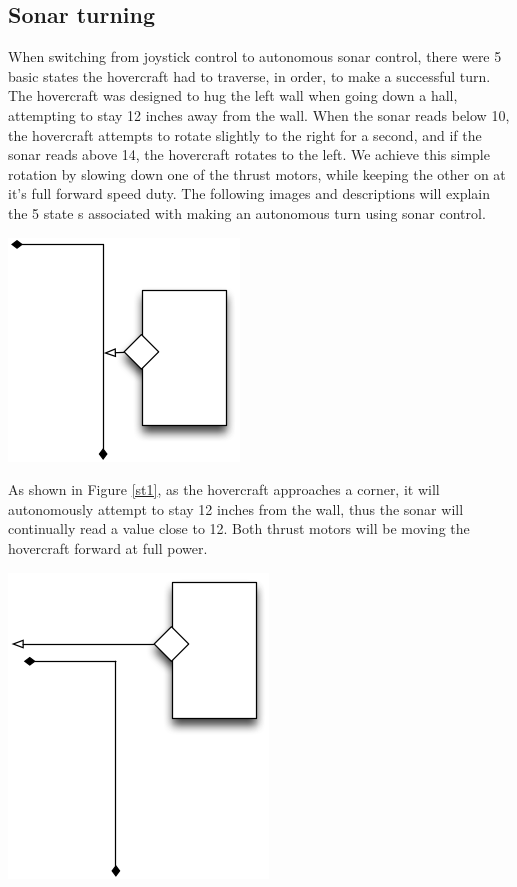 \subsection{Sonar turning}
When switching from joystick control to autonomous sonar control, there were 5 basic states the hovercraft had to traverse, in order, to make a successful turn. The hovercraft was designed to hug the left wall when going down a hall, attempting to stay 12 inches away from the wall. When the sonar reads below 10, the hovercraft attempts to rotate slightly to the right for a second, and if the sonar reads above 14, the hovercraft rotates to the left. We achieve this simple rotation by slowing down one of the thrust motors, while keeping the other on at it's full forward speed duty. The following images and descriptions will explain the 5 state s associated with making an autonomous turn using sonar control.

\begin{center}
 \includegraphics[scale=0.5]{imageSources/sonarturn1.png}
\end{center}
\label{st1}

As shown in Figure \ref{st1}, as the hovercraft approaches a corner, it will autonomously attempt to stay 12 inches from the wall, thus the sonar will continually read a value close to 12. Both thrust motors will be moving the hovercraft forward at full power.

\begin{center}
 \includegraphics[scale=0.5]{imageSources/sonarturn2.png}
\end{center}
\label{st2}

